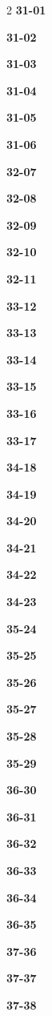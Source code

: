 \documentclass[10pt,a4paper]{article}
\begin{document}
\begin{multicols}{2}
\noindent\textbf{31-01}\ \par
\noindent\textbf{31-02}\ \par
\noindent\textbf{31-03}\ \par
\noindent\textbf{31-04}\ \par
\noindent\textbf{31-05}\ \par
\noindent\textbf{31-06}\ \par
\noindent\textbf{32-07}\ \par
\noindent\textbf{32-08}\ \par
\noindent\textbf{32-09}\ \par
\noindent\textbf{32-10}\ \par
\noindent\textbf{32-11}\ \par
\noindent\textbf{33-12}\ \par
\noindent\textbf{33-13}\ \par
\noindent\textbf{33-14}\ \par
\noindent\textbf{33-15}\ \par
\noindent\textbf{33-16}\ \par
\noindent\textbf{33-17}\ \par
\noindent\textbf{34-18}\ \par
\noindent\textbf{34-19}\ \par
\noindent\textbf{34-20}\ \par
\noindent\textbf{34-21}\ \par
\noindent\textbf{34-22}\ \par
\noindent\textbf{34-23}\ \par
\noindent\textbf{35-24}\ \par
\noindent\textbf{35-25}\ \par
\noindent\textbf{35-26}\ \par
\noindent\textbf{35-27}\ \par
\noindent\textbf{35-28}\ \par
\noindent\textbf{35-29}\ \par
\noindent\textbf{36-30}\ \par
\noindent\textbf{36-31}\ \par
\noindent\textbf{36-32}\ \par
\noindent\textbf{36-33}\ \par
\noindent\textbf{36-34}\ \par
\noindent\textbf{36-35}\ \par
\noindent\textbf{37-36}\ \par
\noindent\textbf{37-37}\ \par
\noindent\textbf{37-38}\ \par

\end{multicols}
\end{document}
